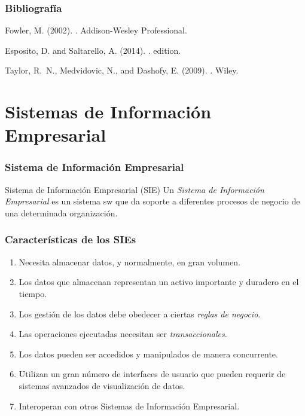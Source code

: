 \documentclass[handout,a4paper,t,xcolor=pst,dvips,colortheme]{beamer}
\begin{document}
\begin{frame}[c]
    \frametitle{Bibliografía}
    \begin{thebibliography}{1}

        Fowler, M. (2002).
        .
        \newblock Addison-Wesley Professional.

        Esposito, D. and Saltarello, A. (2014).
        .
         edition.

        Taylor, R.~N., Medvidovic, N., and Dashofy, E. (2009).
        .
        \newblock Wiley.

    \end{thebibliography}
\end{frame}

\section{Sistemas de Información Empresarial}

\begin{frame}[c]
    \frametitle{Sistema de Información Empresarial}
    \begin{block}{Sistema de Información  Empresarial (SIE)}
        Un \emph{Sistema de Información Empresarial} es un sistema sw que da soporte a diferentes procesos de negocio de una determinada organización.
    \end{block}
\end{frame}

\begin{frame}[c]
    \frametitle{Características de los SIEs}
    \begin{enumerate}[<+->]
        \item Necesita almacenar datos, y normalmente, en gran volumen.
        \item Los datos que almacenan representan un activo importante y duradero en el tiempo.
        \item Los gestión de los datos debe obedecer a ciertas \emph{reglas de negocio}.
        \item Las operaciones ejecutadas necesitan ser \emph{transaccionales}.
        \item Los datos pueden ser accedidos y manipulados de manera concurrente.
        \item Utilizan un gran número de interfaces de usuario que pueden requerir de sistemas avanzados de visualización de datos.
        \item Interoperan con otros Sistemas de Información Empresarial.
    \end{enumerate}
\end{frame}
\end{document}
